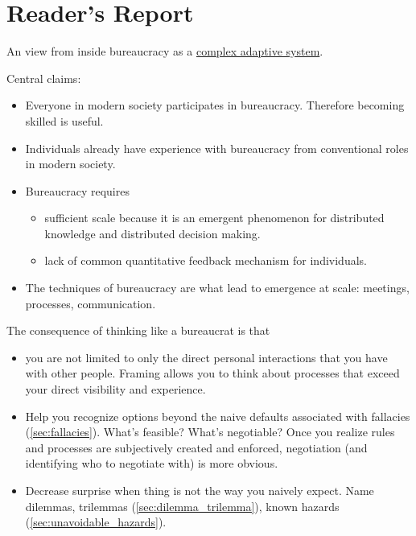 \section{Reader's Report\label{sec:reader_report}}
An view from inside bureaucracy as a \href{https://en.wikipedia.org/wiki/Complexity_theory_and_organizations}{complex adaptive system}. 

Central claims:
\begin{itemize}
    \item Everyone in modern society participates in bureaucracy. Therefore becoming skilled is useful.
    \item Individuals already have experience with bureaucracy from conventional roles in modern society. 
    \item Bureaucracy requires 
    \begin{itemize}
        \item sufficient scale because it is an emergent phenomenon for distributed knowledge and distributed decision making. 
        \item lack of common quantitative feedback mechanism for individuals.
    \end{itemize}
    \item The techniques of bureaucracy are what lead to emergence at scale: meetings, processes, communication. 
\end{itemize}
The consequence of thinking like a bureaucrat is that
\begin{itemize}
    \item you are not limited to only the direct personal interactions that you have with other people. Framing allows you to think about processes that exceed your direct visibility and experience.
    \item Help you recognize options beyond the naive defaults associated with fallacies (\ref{sec:fallacies}). What's feasible? What's negotiable? Once you realize rules and processes are subjectively created and enforced, negotiation (and identifying who to negotiate with) is more obvious.
    \item Decrease surprise when thing is not the way you naively expect. Name dilemmas, trilemmas (\ref{sec:dilemma_trilemma}), known hazards (\ref{sec:unavoidable_hazards}).
\end{itemize}
